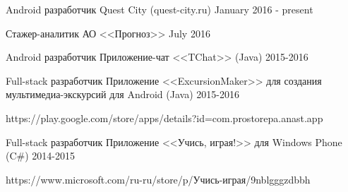 


\begin{cventries}


\cventry
{Android разработчик} %
{Quest City (quest-city.ru)} %
{} %
{January 2016 - present} %
{ %
}


\cventry
{Стажер-аналитик} %
{АО <<Прогноз>>} %
{} %
{July 2016} %
{ %
}


\cventry
{Android разработчик} %
{Приложение-чат <<TChat>> (Java)} %
{} %
{2015-2016} %
{ %
}


\cventry
{Full-stack разработчик} %
{Приложение <<ExcursionMaker>> для создания мультимедиа-экскурсий для Android (Java) } %
{} %
{2015-2016} %
{ %
 \begin{cvitems}
\item {https://play.google.com/store/apps/details?id=com.prostorepa.anast.app}
 \end{cvitems}
}


\cventry
{Full-stack разработчик} %
{Приложение <<Учись, играя!>> для Windows Phone  (C\#) } %
{} %
{2014-2015} %
{ %
 \begin{cvitems}
\item {https://www.microsoft.com/ru-ru/store/p/Учись-играя/9nblgggzdbbh}
 \end{cvitems}
}

\end{cventries}